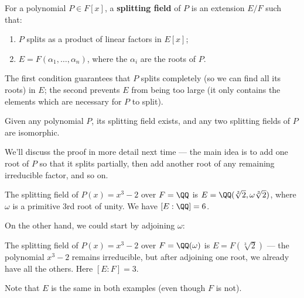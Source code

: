 \begin{definition}
    For a polynomial $P \in F[x]$, a \textbf{splitting field} of $P$ is an extension $E/F$ such that:
    \begin{enumerate}
        \item $P$ splits as a product of linear factors in $E[x]$;
        \item $E = F(\alpha_1, \ldots, \alpha_n)$, where the $\alpha_i$ are the roots of $P$.
    \end{enumerate}
\end{definition}

The first condition guarantees that $P$ splits completely (so we can find all its roots) in $E$; the second prevents $E$ from being too large (it only contains the elements which are necessary for $P$ to split). 

\begin{proposition}
Given any polynomial $P$, its splitting field exists, and any two splitting fields of $P$ are isomorphic. 
\end{proposition}

We'll discuss the proof in more detail next time --- the main idea is to add one root of $P$ so that it splits partially, then add another root of any remaining irreducible factor, and so on. 

\begin{example}
The splitting field of $P(x) = x^3 - 2$ over $F = \QQ$ is $E = \QQ(\sqrt[3]{2}, \omega \sqrt[3]{2})$, where $\omega$ is a primitive $3$rd root of unity. We have $[E : \QQ] = 6$. 
\end{example}

On the other hand, we could start by adjoining $\omega$: 

\begin{example}
The splitting field of $P(x) = x^3 - 2$ over $F = \QQ(\omega)$ is $E = F(\sqrt[3]{2})$ --- the polynomial $x^3 - 2$ remains irreducible, but after adjoining one root, we already have all the others. Here $[E : F] = 3$. 
\end{example}

Note that $E$ is the same in both examples (even though $F$ is not). 


    
